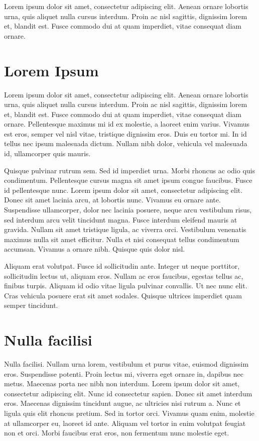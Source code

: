 \documentclass[12pt,letterpaper,english]{article}
\begin{document}
Lorem ipsum dolor sit amet, consectetur adipiscing elit. Aenean ornare lobortis urna, quis aliquet nulla cursus interdum. Proin ac nisl sagittis, dignissim lorem et, blandit est. Fusce commodo dui at quam imperdiet, vitae consequat diam ornare.

\tableofcontents

\clearpage

\doublespacing

\section{Lorem Ipsum}

Lorem ipsum dolor sit amet, consectetur adipiscing elit. Aenean ornare lobortis urna, quis aliquet nulla cursus interdum. Proin ac nisl sagittis, dignissim lorem et, blandit est. Fusce commodo dui at quam imperdiet, vitae consequat diam ornare. Pellentesque maximus mi id ex molestie, a laoreet enim varius. Vivamus est eros, semper vel nisl vitae, tristique dignissim eros. Duis eu tortor mi. In id tellus nec ipsum malesuada dictum. Nullam nibh dolor, vehicula vel malesuada id, ullamcorper quis mauris.

Quisque pulvinar rutrum sem. Sed id imperdiet urna. Morbi rhoncus ac odio quis condimentum. Pellentesque cursus magna sit amet ipsum congue faucibus. Fusce id pellentesque nunc. Lorem ipsum dolor sit amet, consectetur adipiscing elit. Donec sit amet lacinia arcu, at lobortis nunc. Vivamus eu ornare ante. Suspendisse ullamcorper, dolor nec lacinia posuere, neque arcu vestibulum risus, sed interdum arcu velit tincidunt magna. Fusce interdum eleifend mauris at gravida. Nullam sit amet tristique ligula, ac viverra orci. Vestibulum venenatis maximus nulla sit amet efficitur. Nulla et nisi consequat tellus condimentum accumsan. Vivamus a ornare nibh. Quisque quis dolor nisl.

Aliquam erat volutpat. Fusce id sollicitudin ante. Integer ut neque porttitor, sollicitudin lectus ut, aliquam eros. Nullam ac eros faucibus, egestas tellus ac, finibus turpis. Aliquam id odio vitae ligula pulvinar convallis. Ut nec nunc elit. Cras vehicula posuere erat sit amet sodales. Quisque ultrices imperdiet quam semper tincidunt.

\section{Nulla facilisi}

Nulla facilisi. Nullam urna lorem, vestibulum et purus vitae, euismod dignissim eros. Suspendisse potenti. Proin lectus mi, viverra eget ornare in, dapibus nec metus. Maecenas porta nec nibh non interdum. Lorem ipsum dolor sit amet, consectetur adipiscing elit. Nunc id consectetur sapien. Donec sit amet interdum eros. Maecenas dignissim tincidunt augue, ac ultricies nisi rutrum a. Nunc et ligula quis elit rhoncus pretium. Sed in tortor orci. Vivamus quam enim, molestie at ullamcorper eu, laoreet id ante. Aliquam vel tortor in enim volutpat feugiat non et orci. Morbi faucibus erat eros, non fermentum nunc molestie eget.
\end{document}
